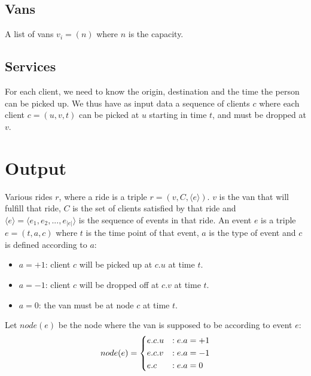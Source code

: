 \subsection{Vans} \label{input-vans}
A list of vans $v_i=(n)$ where $n$ is the capacity.
\subsection{Services} \label{input-services}
For each client, we need to know the origin, destination and the time the person can be picked up.
We thus have as input data a sequence of clients $c$ where each client $c=(u, v, t)$ can be picked at $u$ starting in time $t$, and must be dropped at $v$.
\section{Output}
Various rides $r$, where a ride is a triple $r=(v, C, \langle e \rangle)$. $v$ is the van that will fulfill that ride, $C$ is the set of clients satisfied by that ride and $\langle e \rangle = \langle e_1, e_2,...,e_{|e|} \rangle$ is the sequence of events in that ride. An event $e$ is a triple $e=(t, a, c)$ where $t$ is the time point of that event, $a$ is the type of event and $c$ is defined according to $a$:
\begin{itemize}
    \item $a=+1$: client $c$ will be picked up at $c.u$ at time $t$.
    \item $a=-1$: client $c$ will be dropped off at $c.v$ at time $t$.
    \item $a=0$: the van must be at node $c$ at time $t$.
\end{itemize}
Let $node(e)$ be the node where the van is supposed to be according to event $e$:
\begin{equation*}
    node(e)=\begin{dcases}
        e.c.u & : e.a = +1\\
        e.c.v & : e.a = -1\\
        e.c   & : e.a = 0
    \end{dcases}
\end{equation*}
